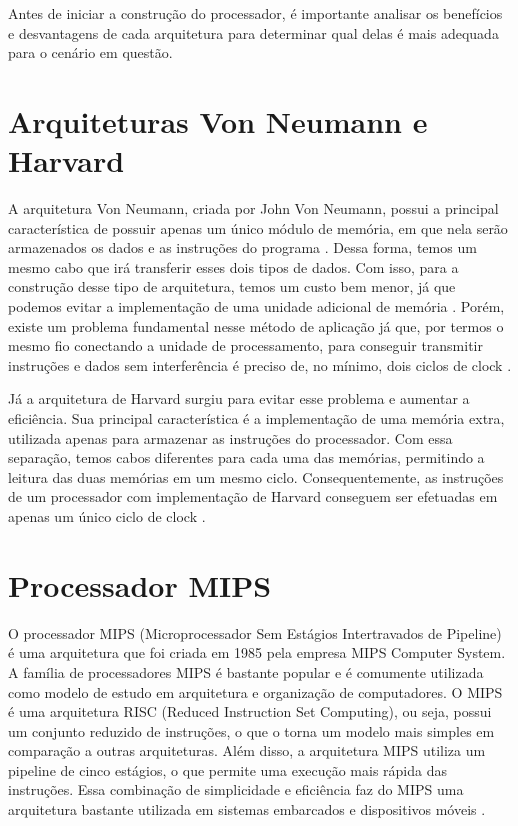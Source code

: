 \documentclass[
	12pt,				%
	openright,			%
	a4paper,			%
	english,			%
	french,				%
	spanish,			%
	brazil,				%
	]{abntex2}
\begin{document}
Antes de iniciar a construção do processador, é importante analisar os benefícios e desvantagens de cada arquitetura para determinar qual delas é mais adequada para o cenário em questão.

\section{Arquiteturas Von Neumann e Harvard}
A arquitetura Von Neumann, criada por John Von Neumann, possui a principal característica de possuir apenas um único módulo de memória, em que nela serão armazenados os dados e as instruções do programa \cite{patterson2018}. Dessa forma, temos um mesmo cabo que irá transferir esses dois tipos de dados. Com isso, para a construção desse tipo de arquitetura, temos um custo bem menor, já que podemos evitar a implementação de uma unidade adicional de memória \cite{patterson2018}. Porém, existe um problema fundamental nesse método de aplicação já que, por termos o mesmo fio conectando a unidade de processamento, para conseguir transmitir instruções e dados sem interferência é preciso de, no mínimo, dois ciclos de clock \cite{stallings2017}.

Já a arquitetura de Harvard surgiu para evitar esse problema e aumentar a eficiência. Sua principal característica é a implementação de uma memória extra, utilizada apenas para armazenar as instruções do processador. Com essa separação, temos cabos diferentes para cada uma das memórias, permitindo a leitura das duas memórias em um mesmo ciclo. Consequentemente, as instruções de um processador com implementação de Harvard conseguem ser efetuadas em apenas um único ciclo de clock \cite{stallings2017}.

\section{Processador MIPS}
O processador MIPS (Microprocessador Sem Estágios Intertravados de Pipeline) é uma arquitetura que foi criada em 1985 pela empresa MIPS Computer System. A família de processadores MIPS é bastante popular e é comumente utilizada como modelo de estudo em arquitetura e organização de computadores. O MIPS é uma arquitetura RISC (Reduced Instruction Set Computing), ou seja, possui um conjunto reduzido de instruções, o que o torna um modelo mais simples em comparação a outras arquiteturas. Além disso, a arquitetura MIPS utiliza um pipeline de cinco estágios, o que permite uma execução mais rápida das instruções. Essa combinação de simplicidade e eficiência faz do MIPS uma arquitetura bastante utilizada em sistemas embarcados e dispositivos móveis \cite{stallings2017}.
\end{document}
